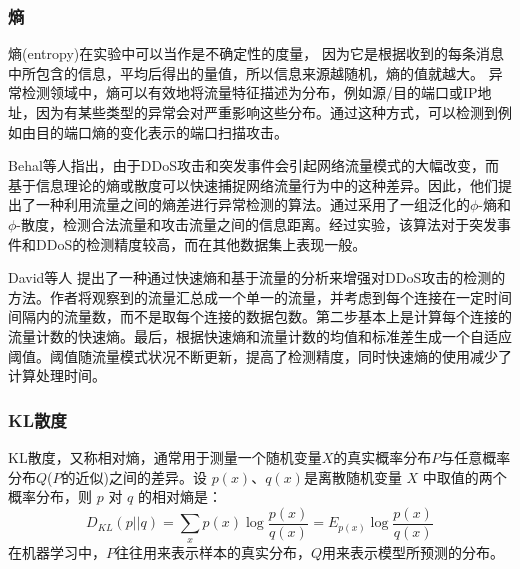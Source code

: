 \subsubsection{熵}
熵(entropy)在实验中可以当作是不确定性的度量， 因为它是根据收到的每条消息中所包含的信息，平均后得出的量值，所以信息来源越随机，熵的值就越大。
异常检测领域中，熵可以有效地将流量特征描述为分布，例如源/目的端口或IP地址，因为有某些类型的异常会对严重影响这些分布。通过这种方式，可以检测到例如由目的端口熵的变化表示的端口扫描攻击。

Behal等人\cite{behal2017detection}指出，由于DDoS攻击和突发事件会引起网络流量模式的大幅改变，而基于信息理论的熵或散度可以快速捕捉网络流量行为中的这种差异。因此，他们提出了一种利用流量之间的熵差进行异常检测的算法。通过采用了一组泛化的$\phi$-熵和$\phi$-散度，检测合法流量和攻击流量之间的信息距离。经过实验，该算法对于突发事件和DDoS的检测精度较高，而在其他数据集上表现一般。

David等人\cite{david2015ddos} 提出了一种通过快速熵和基于流量的分析来增强对DDoS攻击的检测的方法。作者将观察到的流量汇总成一个单一的流量，并考虑到每个连接在一定时间间隔内的流量数，而不是取每个连接的数据包数。第二步基本上是计算每个连接的流量计数的快速熵。最后，根据快速熵和流量计数的均值和标准差生成一个自适应阈值。阈值随流量模式状况不断更新，提高了检测精度，同时快速熵的使用减少了计算处理时间。






\subsubsection{KL散度}
KL散度，又称相对熵，通常用于测量一个随机变量$X$的真实概率分布$P$与任意概率分布$Q$($P$的近似)之间的差异。设 $p(x)$、$q(x)$是离散随机变量 $X$ 中取值的两个概率分布，则 $p$ 对 $q$ 的相对熵是：
\begin{equation}
    D_{KL}(p||q) = \sum_x p(x) \log \frac{p(x)}{q(x)} = E_{p(x)} \log \frac{p(x)}{q(x)}
\end{equation}
在机器学习中，$P$往往用来表示样本的真实分布，$Q$用来表示模型所预测的分布。


